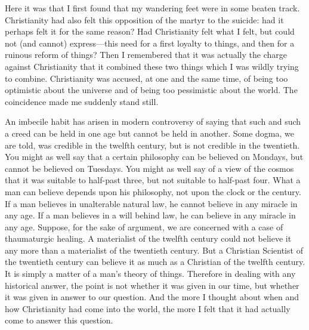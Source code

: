 \documentclass{book}
\begin{document}
Here it was that I first found that my wandering feet were in some beaten track. Christianity had also felt this opposition of the martyr to the suicide: had it perhaps felt it for the same reason? Had Christianity felt what I felt, but could not (and cannot) express—this need for a first loyalty to things, and then for a ruinous reform of things? Then I remembered that it was actually the charge against Christianity that it combined these two things which I was wildly trying to combine. Christianity was accused, at one and the same time, of being too optimistic about the universe and of being too pessimistic about the world. The coincidence made me suddenly stand still.

An imbecile habit has arisen in modern controversy of saying that such and such a creed can be held in one age but cannot be held in another. Some dogma, we are told, was credible in the twelfth century, but is not credible in the twentieth. You might as well say that a certain philosophy can be believed on Mondays, but cannot be believed on Tuesdays. You might as well say of a view of the cosmos that it was suitable to half-past three, but not suitable to half-past four. What a man can believe depends upon his philosophy, not upon the clock or the century. If a man believes in unalterable natural law, he cannot believe in any miracle in any age. If a man believes in a will behind law, he can believe in any miracle in any age. Suppose, for the sake of argument, we are concerned with a case of thaumaturgic healing. A materialist of the twelfth century could not believe it any more than a materialist of the twentieth century. But a Christian Scientist of the twentieth century can believe it as much as a Christian of the twelfth century. It is simply a matter of a man’s theory of things. Therefore in dealing with any historical answer, the point is not whether it was given in our time, but whether it was given in answer to our question. And the more I thought about when and how Christianity had come into the world, the more I felt that it had actually come to answer this question.
\end{document}
